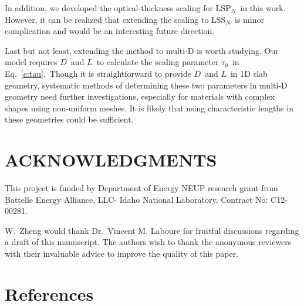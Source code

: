 \documentclass[review]{elsarticle}
\newcommand{\sn}{S$_N$}
\newcommand{\pn}{P$_N$}
\begin{document}
{In addition, we developed the optical-thickness scaling for LS\pn\ in this work. However, it can be realized that extending the scaling to LS\sn\ is minor complication and would be an interesting future direction.}

{Last but not least, extending the method to multi-D is worth studying. Our model requires $D$\ and $L$\ to calculate the scaling parameter $\tau_0$\ in Eq.\ \eqref{e:tau}.\ Though it is straightforward to provide $D$\ and $L$\ in 1D slab geometry, systematic methods of determining these two parameters in multi-D geometry need further investigations, especially for materials with complex shapes using non-uniform meshes. It is likely that using characteristic lengths in these geometries could be sufficient.}


%
\section*{ACKNOWLEDGMENTS}
This project is funded by Department of Energy NEUP research grant from Battelle Energy Alliance, LLC- Idaho National Laboratory, Contract No: C12-00281.

W.\ Zheng would thank Dr.\ Vincent M. Laboure for fruitful discussions regarding a draft of this manuscript. The authors wish to thank the anonymous reviewers with their invaluable advice to improve the quality of this paper.
\section*{References}

\end{document}
